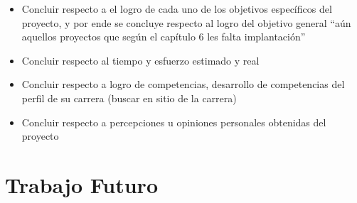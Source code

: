 


\begin{itemize}
    \item  Concluir respecto a el logro de cada uno de los objetivos específicos del proyecto, y por ende se concluye respecto al logro del objetivo general “aún aquellos proyectos que según el capítulo 6 les falta implantación”
    \item Concluir respecto al tiempo y esfuerzo estimado y real
    \item Concluir respecto a logro de competencias, desarrollo de competencias del perfil de su carrera (buscar en sitio de la carrera) 
    \item Concluir respecto a percepciones u opiniones personales obtenidas del proyecto
\end{itemize}


\section{Trabajo Futuro}